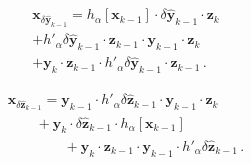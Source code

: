 \documentclass[letterpaper,twocolumn,amsmath,amsfont,amssymb,english,aps,jcp,preprintnumbers,groupaddress,nofootinbib,tightenlines]{revtex4}
\newcommand{\mat}[1]{\boldsymbol{#1}}
\begin{document}


\begin{multline}
  \mat{x}_{\delta \widehat{ \mat{y}}_{k-1}} = h_\alpha \left[ \mat{x}_{k-1} \right]  \cdot \delta \widehat{\mat{y}}_{k-1} \cdot \mat{z}_{k} \\
 +  h'_\alpha  \delta \widehat{\mat{y}}_{k-1} \cdot \mat{z}_{k-1} \cdot  \mat{y}_{k-1} \cdot  \mat{z}_{k} \\
 + \mat{y}_{k} \cdot \mat{z}_{k-1} \cdot h'_\alpha \delta \widehat{\mat{y}}_{k-1} \cdot \mat{z}_{k-1}  \, .
\end{multline}


\begin{multline}
 \mat{x}_{\delta \widehat{ \mat{z}}_{k-1}} =  {\mat{y}}_{k-1} \cdot  h'_\alpha \delta \widehat{ \mat{z}}_{k-1} \cdot  \mat{y}_{k-1}  \cdot \mat{z}_{k} \\
\qquad + \mat{y}_k \cdot  \delta \widehat{\mat{z}}_{k-1} \cdot   h_\alpha \left[ \mat{x}_{k-1} \right] \\
\qquad \qquad +  \mat{y}_{k} \cdot  \mat{z}_{k-1} \cdot {\mat{y}}_{k-1} \cdot h'_\alpha \delta \widehat{\mat{z}}_{k-1} \, .
\end{multline}
\end{document}
